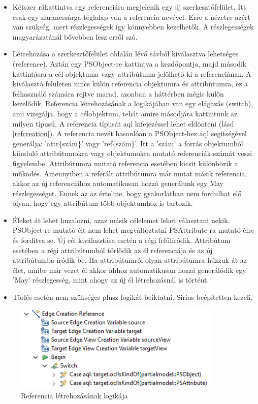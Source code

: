 \begin{itemize}  	
	\item Kétszer rákattintva egy referenciára megjelenik egy új szerkesztőfelület. Itt csak egy narancssárga téglalap van a referencia nevével. Erre a nézetre azért van szükség, mert részlegességek így könnyebben kezelhetők. A részlegességek magyarázatánál bővebben lesz erről szó.
	
	\item Létrehozása a szerkesztőfelület oldalán lévő sávból kiválasztva lehetséges (reference). Aztán egy PSObject-re kattintva a kezdőpontja, majd második kattintásra a cél objektuma vagy attribútuma jelölhető ki a referenciának. A kiválasztó felületen nincs külön referencia objektumra és attribútumra, ez a felhasználó számára rejtve marad, azonban a háttérben mégis külön kezelődik. Referencia létrehozásának a logikájában van egy elágazás (switch), ami vizsgálja, hogy a célobjektum, tehát amire másodjára kattintunk az milyen típusú. A referencia típusát aql kifejezéssel lehet eldönteni (lásd \autoref{refcreation}). A referencia nevét hasonlóan a PSObject-hez aql segítségével generálja: 'attr\{szám\}' vagy 'ref\{szám\}'. Itt a 'szám' a forrás objektumból kiinduló attribútumokra vagy objektumokra mutató referenciák számát veszi figyelembe. Attribútumra mutató referencia esetében kicsit különbözik a működés. Amennyiben a referált attribútumra már mutat másik referencia, akkor az új referenciához automatikusan hozzá generálunk egy May részlegességet. Ennek az az értelme, hogy gyakorlatban nem fordulhat elő olyan, hogy egy attribútum több objektumhoz is tartozik.
	
	\item Éleket át lehet huzalozni, azaz másik célelemet lehet választani nekik. PSObject-re mutató élt nem lehet megváltoztatni PSAttribute-ra mutató élre és fordítva se. Új cél kiválasztása esetén a régi felülíródik. Attribútum esetében a régi attribútumból törlődik az él referenciája és az új attribútumba íródik be. Ha attribútumról olyan attribútumra húzzuk át az élet, amibe már vezet él akkor ahhoz  automatikusan hozzá generálódik egy 'May' részlegesség, mint ahogy az új él létrehozásnál is történt.
	
	\item Törlés esetén nem szükséges plusz logikát beiktatni. Sirius  beépítetten kezeli.
\end{itemize}

\begin{figure}[!htp]
	\centering
	\includegraphics[width=100mm]{figures/refcreation.PNG}
	\caption{Referencia létrehozásának logikája}
	\label{refcreation} 
\end{figure}

